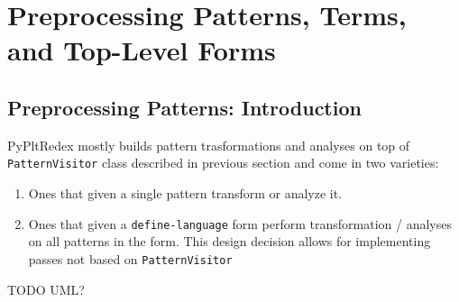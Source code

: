 \chapter{Preprocessing Patterns, Terms, and Top-Level Forms}



\section{Preprocessing Patterns: Introduction}
PyPltRedex mostly builds pattern trasformations and analyses on top of \texttt{PatternVisitor} class described in previous section and come in two varieties:

\begin{enumerate}
\item Ones that given a single pattern transform or analyze it.
\item Ones that given a \texttt{define-language} form perform transformation / analyses on all patterns in the form. This design decision allows for implementing passes not based on \texttt{PatternVisitor}
\end{enumerate}

TODO UML?







%
%






